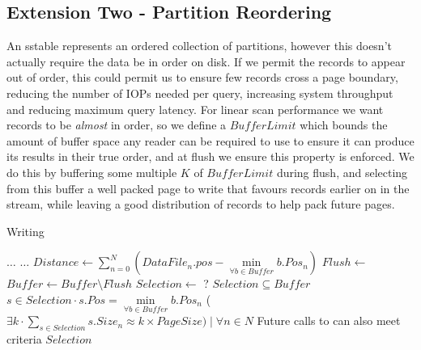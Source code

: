 \documentclass[fleqn]{article}
\begin{document}
\clearpage
\subsection{Extension Two - Partition Reordering}
\small
    An sstable represents an ordered collection of partitions, however this doesn't
    actually require the data be in order on disk. If we permit the records to appear
    out of order, this could permit us to ensure few records cross a page boundary,
    reducing the number of IOPs needed per query, increasing system throughput and reducing
    maximum query latency. For linear scan performance we want records to be \emph{almost} 
    in order, so we define a $BufferLimit$ which bounds the amount of buffer space any reader can
    be required to use to ensure it can produce its results in their true order, and at flush we 
    ensure this property is enforced. We do this by buffering some multiple $K$ of $BufferLimit$ during 
    flush, and selecting from this buffer a well packed page to write that favours records earlier
    on in the stream, while leaving a good distribution of records to help pack future pages.

\begin{algorithm}
\scriptsize
\caption{Writing}
\begin{algorithmic}[1]
\State $\dots$
\Statex
{} 
 \State $\dots$
 \State $Distance \gets \sum\limits_{n=0}^{N} (DataFile_{n}.pos - \min\limits_{\forall b \in Buffer} b.Pos_{n}) $
   \State $Flush \gets$ 
   \State {}
   \State $Buffer \gets Buffer \setminus Flush$
 \EndIf
\EndFor
\EndProcedure
\Statex
{}
\State $Selection \gets$ ?
\Ensure $Selection \subseteq Buffer$
\Ensure $s \in Selection \cdot s.Pos = \min\limits_{\forall b \in Buffer} b.Pos_{n}$
\Ensure ($\exists k \cdot \sum\limits_{s \in Selection} s.Size_{n} \approx k \times PageSize) \mid \forall n \in N $
\Ensure Future calls to  can also meet criteria
\State \Return $Selection$
\EndFunction
\end{algorithmic}
\end{algorithm}
\end{document}
